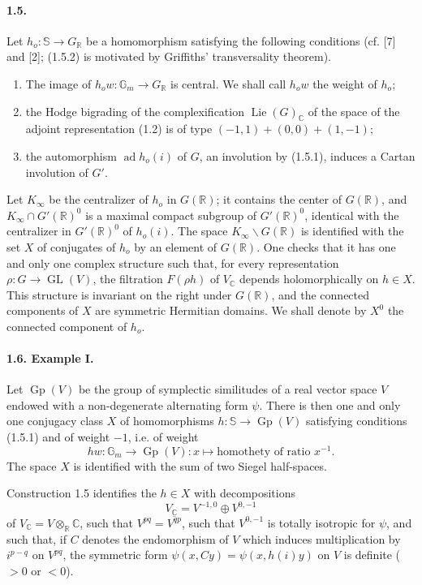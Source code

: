 \documentclass[10pt]{article}
\newcommand{\C}{\mathbb C}
\newcommand{\Gm}{\mathbb G_m}
\newcommand{\R}{\mathbb R}
\newcommand{\bS}{\mathbb S}
\newcommand{\GL}{\operatorname{GL}}
\newcommand{\Gp}{\operatorname{Gp}}
\newcommand{\Lie}{\operatorname{Lie}}
\newcommand{\ad}{\operatorname{ad}}
\begin{document}
\paragraph{1.5.} Let $h_o:\bS\to G_\R$ be a homomorphism satisfying the following conditions (cf. [7] and [2]; (1.5.2) is motivated by Griffiths' transversality theorem).

\begin{enumerate}[label={(1.5.\arabic*)},leftmargin=3.0em]
\item The image of $h_ow:\Gm\to G_\R$ is central. We shall call $h_ow$ the weight of $h_o$;
\item the Hodge bigrading of the complexification $\Lie(G)_\C$ of the space of the adjoint representation (1.2) is of type $(-1,1)+(0,0)+(1,-1)$;
\item the automorphism $\ad h_o(i)$ of $G$, an involution by (1.5.1), induces a Cartan involution of $G'$.
\end{enumerate}

Let $K_\infty$ be the centralizer of $h_o$ in $G(\R)$; it contains the center of $G(\R)$, and $K_\infty\cap G'(\R)^0$ is a maximal compact subgroup of $G'(\R)^0$, identical with the centralizer in $G'(\R)^0$ of $h_o(i)$. The space $K_\infty\backslash G(\R)$ is identified with the set $X$ of conjugates of $h_o$ by an element of $G(\R)$. One checks that it has one and only one complex structure such that, for every representation $\rho:G\to\GL(V)$, the filtration $F(\rho h)$ of $V_\C$ depends holomorphically on $h\in X$. This structure is invariant on the right under $G(\R)$, and the connected components of $X$ are symmetric Hermitian domains. We shall denote by $X^0$ the connected component of $h_o$.

\paragraph{1.6. Example I.} Let $\Gp(V)$ be the group of symplectic similitudes of a real vector space $V$ endowed with a non-degenerate alternating form $\psi$. There is then one and only one conjugacy class $X$ of homomorphisms $h:\bS\to\Gp(V)$ satisfying conditions (1.5.1) and of weight $-1$, i.e. of weight
\[
hw:\Gm\to\Gp(V):x\longmapsto\text{homothety of ratio }x^{-1}.
\]
The space $X$ is identified with the sum of two Siegel half-spaces.

Construction 1.5 identifies the $h\in X$ with decompositions
\[
V_\C=V^{-1,0}\oplus V^{0,-1}
\]
of $V_\C=V\otimes_\R\C$, such that $V^{pq}=\overline{V^{qp}}$, such that $V^{0,-1}$ is totally isotropic for $\psi$, and such that, if $C$ denotes the endomorphism of $V$ which induces multiplication by $i^{p-q}$ on $V^{pq}$, the symmetric form $\psi(x,Cy)=\psi(x,h(i)y)$ on $V$ is definite ($>0$ or $<0$).
\end{document}
